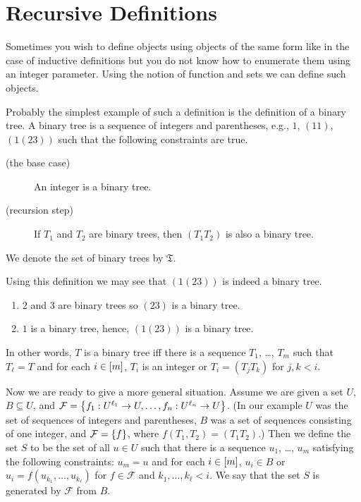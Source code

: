 \section{Recursive Definitions}
Sometimes you wish to define objects using objects of the same form like in the
case of inductive definitions but you do not know how to enumerate them using
an integer parameter. Using the notion of function and sets we can define such
objects.


Probably the simplest example of such a definition is the definition of a
binary tree. A binary tree is a sequence of integers and parentheses, e.g.,
$1$, $(1 1)$, $(1 (2 3))$ such that the following constraints are true.
\begin{description}
  \item [(the base case)] An integer is a binary tree.
  \item[(recursion step)] If $T_1$ and $T_2$ are binary trees, then
    $(T_1 T_2)$ is also a binary tree.
\end{description}
We denote the set of binary trees by $\mathfrak{T}$.

Using this definition we may see that $(1 (2 3))$ is indeed a binary tree.
\begin{enumerate}
  \item $2$ and $3$ are binary trees so $(2 3)$ is a binary tree.
  \item $1$ is a binary tree, hence, $(1 (2 3))$ is a binary tree.
\end{enumerate}

In other words, $T$ is a binary tree iff there is a sequence
$T_1$, \dots, $T_m$ such that $T_\ell = T$ and for each $i \in [{m}]$,
$T_i$ is an integer or $T_i = (T_j T_k)$ for $j, k < i$.

Now we are ready to give a more general situation. Assume we are given a set
$U$, $B \subseteq U$, and
$\mathcal{F} = \set{f_1 : U^{\ell_1} \to U, \dots, f_n : U^{\ell_n} \to U}$.
(In our example $U$ was the set of sequences of integers and parentheses,
$B$ was a set of sequences consisting of one integer, and
$\mathcal{F} = \set{f}$, where $f(T_1, T_2) = (T_1 T_2)$.) Then we define the
set $S$ to be the set of all $u \in U$ such that there is a sequence
$u_1$, \dots, $u_m$ satisfying the following constraints: $u_m = u$ and
for each $i \in [{m}]$, $u_i \in B$ or $u_i = f(u_{k_1}, \dots, u_{k_\ell})$
for $f \in \mathcal{F}$ and $k_1, \dots, k_\ell < i$. We say that the set $S$
is generated by $\mathcal{F}$ from $B$.

